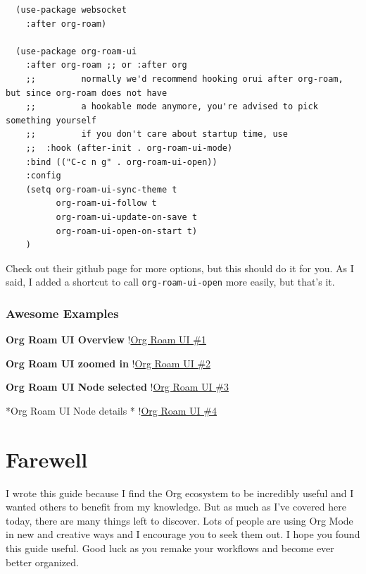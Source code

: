 \documentclass[11pt]{article}
\begin{document}
\begin{verbatim}
  (use-package websocket
    :after org-roam)

  (use-package org-roam-ui
    :after org-roam ;; or :after org
    ;;         normally we'd recommend hooking orui after org-roam, but since org-roam does not have
    ;;         a hookable mode anymore, you're advised to pick something yourself
    ;;         if you don't care about startup time, use
    ;;  :hook (after-init . org-roam-ui-mode)
    :bind (("C-c n g" . org-roam-ui-open))
    :config
    (setq org-roam-ui-sync-theme t
          org-roam-ui-follow t
          org-roam-ui-update-on-save t
          org-roam-ui-open-on-start t)
    )
\end{verbatim}

Check out their github page for more options, but this should do it for you. As I said, I added a shortcut to call \texttt{org-roam-ui-open} more easily, but that's it.
\subsubsection*{Awesome Examples}
\label{sec:org18b16db}
\textbf{Org Roam UI Overview}
!\href{images/org-roam-ui-1.png}{Org Roam UI \#1}

\textbf{Org Roam UI zoomed in}
!\href{images/org-roam-ui-2.png}{Org Roam UI \#2}

\textbf{Org Roam UI Node selected}
!\href{images/org-roam-ui-3.png}{Org Roam UI \#3}

*Org Roam UI Node details *
!\href{images/org-roam-ui-4.png}{Org Roam UI \#4}
\section*{Farewell}
\label{sec:orgbc5f7f1}
I wrote this guide because I find the Org ecosystem to be incredibly useful and I wanted others to benefit from my knowledge. But as much as I've covered here today, there are many things left to discover. Lots of people are using Org Mode in new and creative ways and I encourage you to seek them out. I hope you found this guide useful. Good luck as you remake your workflows and become ever better organized.
\end{document}
